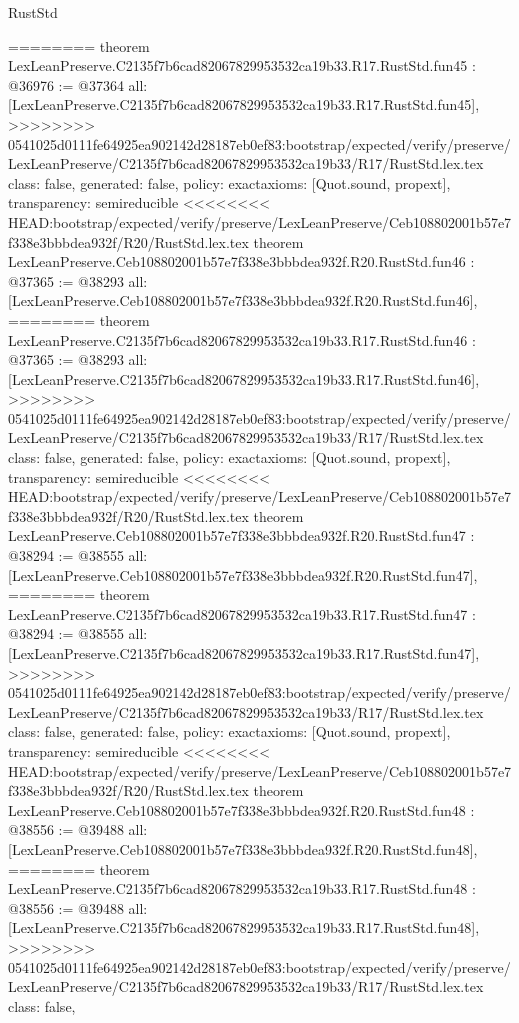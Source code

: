 \begin{lexlean}{RustStd}
\begin{coremodule}
{\begin{coremodule}
{{{{{{{{{{{{{{{{{{{{{{{{{{{{{{{{{{{{{{{{{{{{{{{{========
theorem LexLeanPreserve.C2135f7b6cad82067829953532ca19b33.R17.RustStd.fun45 : @36976 := @37364 {
  all: [LexLeanPreserve.C2135f7b6cad82067829953532ca19b33.R17.RustStd.fun45],
>>>>>>>> 0541025d0111fe64925ea902142d28187eb0ef83:bootstrap/expected/verify/preserve/LexLeanPreserve/C2135f7b6cad82067829953532ca19b33/R17/RustStd.lex.tex
  class: false,
  generated: false,
  policy: exact{axioms: [Quot.sound, propext]},
  transparency: semireducible
}
<<<<<<<< HEAD:bootstrap/expected/verify/preserve/LexLeanPreserve/Ceb108802001b57e7f338e3bbbdea932f/R20/RustStd.lex.tex
theorem LexLeanPreserve.Ceb108802001b57e7f338e3bbbdea932f.R20.RustStd.fun46 : @37365 := @38293 {
  all: [LexLeanPreserve.Ceb108802001b57e7f338e3bbbdea932f.R20.RustStd.fun46],
========
theorem LexLeanPreserve.C2135f7b6cad82067829953532ca19b33.R17.RustStd.fun46 : @37365 := @38293 {
  all: [LexLeanPreserve.C2135f7b6cad82067829953532ca19b33.R17.RustStd.fun46],
>>>>>>>> 0541025d0111fe64925ea902142d28187eb0ef83:bootstrap/expected/verify/preserve/LexLeanPreserve/C2135f7b6cad82067829953532ca19b33/R17/RustStd.lex.tex
  class: false,
  generated: false,
  policy: exact{axioms: [Quot.sound, propext]},
  transparency: semireducible
}
<<<<<<<< HEAD:bootstrap/expected/verify/preserve/LexLeanPreserve/Ceb108802001b57e7f338e3bbbdea932f/R20/RustStd.lex.tex
theorem LexLeanPreserve.Ceb108802001b57e7f338e3bbbdea932f.R20.RustStd.fun47 : @38294 := @38555 {
  all: [LexLeanPreserve.Ceb108802001b57e7f338e3bbbdea932f.R20.RustStd.fun47],
========
theorem LexLeanPreserve.C2135f7b6cad82067829953532ca19b33.R17.RustStd.fun47 : @38294 := @38555 {
  all: [LexLeanPreserve.C2135f7b6cad82067829953532ca19b33.R17.RustStd.fun47],
>>>>>>>> 0541025d0111fe64925ea902142d28187eb0ef83:bootstrap/expected/verify/preserve/LexLeanPreserve/C2135f7b6cad82067829953532ca19b33/R17/RustStd.lex.tex
  class: false,
  generated: false,
  policy: exact{axioms: [Quot.sound, propext]},
  transparency: semireducible
}
<<<<<<<< HEAD:bootstrap/expected/verify/preserve/LexLeanPreserve/Ceb108802001b57e7f338e3bbbdea932f/R20/RustStd.lex.tex
theorem LexLeanPreserve.Ceb108802001b57e7f338e3bbbdea932f.R20.RustStd.fun48 : @38556 := @39488 {
  all: [LexLeanPreserve.Ceb108802001b57e7f338e3bbbdea932f.R20.RustStd.fun48],
========
theorem LexLeanPreserve.C2135f7b6cad82067829953532ca19b33.R17.RustStd.fun48 : @38556 := @39488 {
  all: [LexLeanPreserve.C2135f7b6cad82067829953532ca19b33.R17.RustStd.fun48],
>>>>>>>> 0541025d0111fe64925ea902142d28187eb0ef83:bootstrap/expected/verify/preserve/LexLeanPreserve/C2135f7b6cad82067829953532ca19b33/R17/RustStd.lex.tex
  class: false,
}}}}}}}}}}}}}}}}}}}}}}}}}}}}}}}}}}}}}}}}}}}}}}}}}}}}
\end{coremodule}}
\end{coremodule}
\end{lexlean}
